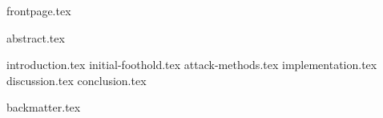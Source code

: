 \documentclass{article}
\begin{document}
{frontpage.tex}


\newpage

{abstract.tex}
\newpage

\tableofcontents
\newpage

\printglossary[type=\acronymtype,title=Abbreviations]
\newpage


{introduction.tex}
{initial-foothold.tex}
{attack-methods.tex}
{implementation.tex}
{discussion.tex}
{conclusion.tex}

{backmatter.tex}
\end{document}
